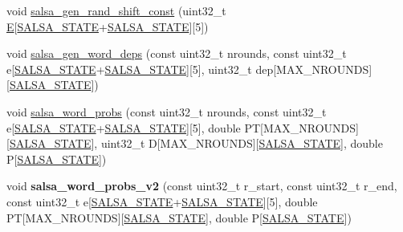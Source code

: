 \begin{DoxyCompactItemize}
\item 
void \hyperlink{salsa_8hh_a496fa3f57622f1769cd5b6a72178bdaf}{salsa\-\_\-gen\-\_\-rand\-\_\-shift\-\_\-const} (uint32\-\_\-t \hyperlink{salsa_8hh_ab44999d45b6e0fee6f910387230b783a}{\-E}\mbox{[}\hyperlink{salsa_8hh_a642186115ff24eb2f42febb3ccaa093f}{\-S\-A\-L\-S\-A\-\_\-\-S\-T\-A\-T\-E}+\hyperlink{salsa_8hh_a642186115ff24eb2f42febb3ccaa093f}{\-S\-A\-L\-S\-A\-\_\-\-S\-T\-A\-T\-E}\mbox{]}\mbox{[}5\mbox{]})
\item 
void \hyperlink{salsa_8hh_af2d8a96fe890b36bec9d8f5bdf99ac82}{salsa\-\_\-gen\-\_\-word\-\_\-deps} (const uint32\-\_\-t nrounds, const uint32\-\_\-t e\mbox{[}\hyperlink{salsa_8hh_a642186115ff24eb2f42febb3ccaa093f}{\-S\-A\-L\-S\-A\-\_\-\-S\-T\-A\-T\-E}+\hyperlink{salsa_8hh_a642186115ff24eb2f42febb3ccaa093f}{\-S\-A\-L\-S\-A\-\_\-\-S\-T\-A\-T\-E}\mbox{]}\mbox{[}5\mbox{]}, uint32\-\_\-t dep\mbox{[}\-M\-A\-X\-\_\-\-N\-R\-O\-U\-N\-D\-S\mbox{]}\mbox{[}\hyperlink{salsa_8hh_a642186115ff24eb2f42febb3ccaa093f}{\-S\-A\-L\-S\-A\-\_\-\-S\-T\-A\-T\-E}\mbox{]})
\item 
void \hyperlink{salsa_8hh_a286f3009b9c24e47535b0c0e0383e9b4}{salsa\-\_\-word\-\_\-probs} (const uint32\-\_\-t nrounds, const uint32\-\_\-t e\mbox{[}\hyperlink{salsa_8hh_a642186115ff24eb2f42febb3ccaa093f}{\-S\-A\-L\-S\-A\-\_\-\-S\-T\-A\-T\-E}+\hyperlink{salsa_8hh_a642186115ff24eb2f42febb3ccaa093f}{\-S\-A\-L\-S\-A\-\_\-\-S\-T\-A\-T\-E}\mbox{]}\mbox{[}5\mbox{]}, double \-P\-T\mbox{[}\-M\-A\-X\-\_\-\-N\-R\-O\-U\-N\-D\-S\mbox{]}\mbox{[}\hyperlink{salsa_8hh_a642186115ff24eb2f42febb3ccaa093f}{\-S\-A\-L\-S\-A\-\_\-\-S\-T\-A\-T\-E}\mbox{]}, uint32\-\_\-t \-D\mbox{[}\-M\-A\-X\-\_\-\-N\-R\-O\-U\-N\-D\-S\mbox{]}\mbox{[}\hyperlink{salsa_8hh_a642186115ff24eb2f42febb3ccaa093f}{\-S\-A\-L\-S\-A\-\_\-\-S\-T\-A\-T\-E}\mbox{]}, double \-P\mbox{[}\hyperlink{salsa_8hh_a642186115ff24eb2f42febb3ccaa093f}{\-S\-A\-L\-S\-A\-\_\-\-S\-T\-A\-T\-E}\mbox{]})
\item 
\hypertarget{salsa_8hh_a2f556091ae55b7ba91f3e4268bb95003}{void {\bfseries salsa\-\_\-word\-\_\-probs\-\_\-v2} (const uint32\-\_\-t r\-\_\-start, const uint32\-\_\-t r\-\_\-end, const uint32\-\_\-t e\mbox{[}\hyperlink{salsa_8hh_a642186115ff24eb2f42febb3ccaa093f}{\-S\-A\-L\-S\-A\-\_\-\-S\-T\-A\-T\-E}+\hyperlink{salsa_8hh_a642186115ff24eb2f42febb3ccaa093f}{\-S\-A\-L\-S\-A\-\_\-\-S\-T\-A\-T\-E}\mbox{]}\mbox{[}5\mbox{]}, double \-P\-T\mbox{[}\-M\-A\-X\-\_\-\-N\-R\-O\-U\-N\-D\-S\mbox{]}\mbox{[}\hyperlink{salsa_8hh_a642186115ff24eb2f42febb3ccaa093f}{\-S\-A\-L\-S\-A\-\_\-\-S\-T\-A\-T\-E}\mbox{]}, double \-P\mbox{[}\hyperlink{salsa_8hh_a642186115ff24eb2f42febb3ccaa093f}{\-S\-A\-L\-S\-A\-\_\-\-S\-T\-A\-T\-E}\mbox{]})}\label{salsa_8hh_a2f556091ae55b7ba91f3e4268bb95003}


\end{DoxyCompactItemize}
